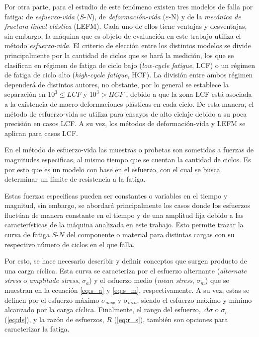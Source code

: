 Por otra parte, para el estudio de este fenómeno existen tres modelos de falla por fatiga: de \textit{esfuerzo-vida} ($S$-$N$), de \textit{deformación-vida }($\varepsilon$-N) y de la \textit{mecánica de fractura lineal elástica} (LEFM). Cada uno de ellos tiene ventajas y desventajas, sin embargo, la máquina que es objeto de evaluación en este trabajo utiliza el método \textit{esfuerzo-vida}. El criterio de elección entre los distintos modelos se divide principalmente por la cantidad de ciclos que se hará la medición, los que se clasifican en régimen de fatiga de ciclo bajo (\textit{low-cycle fatigue}, LCF) o un régimen de fatiga de ciclo alto (\textit{high-cycle fatigue}, HCF). La división entre ambos régimen dependerá de distintos autores, no obstante, por lo general se establece la separación en $10^3 \leq LCF$ y $10^3 > HCF$ \cite{budynas2008shigley}, debido a que la zona LCF está asociada a la existencia de macro-deformaciones plásticas en cada ciclo. De esta manera, el método de esfuerzo-vida se utiliza para ensayos de alto ciclaje debido a su poca precisión en casos LCF. A su vez, los métodos de deformación-vida y LEFM se aplican para casos LCF.

En el método de esfuerzo-vida las muestras o probetas son sometidas a fuerzas de magnitudes especificas, al mismo tiempo que se cuentan la cantidad de ciclos. Es por esto que es un modelo con base en el esfuerzo, con el cual se busca determinar un límite de resistencia a la fatiga. 

Estas fuerzas especificas pueden ser constantes o variables en el tiempo y magnitud, sin embargo, se abordará principalmente los casos donde los esfuerzos fluctúan de manera constante en el tiempo y de una amplitud fija debido a las características de la máquina analizada en este trabajo. Esto permite trazar la curva de fatiga $S$-$N$ del componente o material para distintas cargas con su respectivo número de ciclos en el que falla.

Por esto, se hace necesario describir y definir conceptos que surgen producto de una carga cíclica. Esta curva se caracteriza por el esfuerzo alternante (\textit{alternate stress} o \textit{amplitude stress}, $\sigma_a$) y el esfuerzo medio (\textit{mean stress}, $\sigma_m$) que se muestran en la ecuación \ref{eq:s_a} y \ref{eq:s_m}, respectivamente. A su vez, estas se definen por el esfuerzo máximo $\sigma_{max}$ y $\sigma_{min}$, siendo el esfuerzo máximo y mínimo alcanzado por la carga cíclica. Finalmente, el rango del esfuerzo, $\Delta \sigma$ o $\sigma_r$ (\ref{eq:ds}), y la razón de esfuerzos, $R$ (\ref{eq:r_s}), también son opciones  para caracterizar la fatiga.

